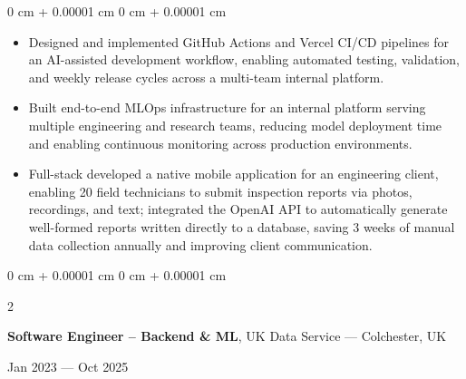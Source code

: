 \documentclass[6pt, letterpaper]{article}
\newenvironment{highlights}{
    \begin{itemize}[
        topsep=0.03 cm,
        parsep=0.03 cm,
        partopsep=0pt,
        itemsep=0pt,
        leftmargin=0 cm + 10pt
    ]
}{
    \end{itemize}
} %
\newenvironment{onecolentry}{
    \begin{adjustwidth}{
        0 cm + 0.00001 cm
    }{
        0 cm + 0.00001 cm
    }
}{
    \end{adjustwidth}
} %
\newenvironment{twocolentry}[2][]{
    \onecolentry
    \def\secondColumn{#2}
    \setcolumnwidth{\fill, 4.5 cm}
    \begin{paracol}{2}
}{
    \switchcolumn \raggedleft \secondColumn
    \end{paracol}
    \endonecolentry
} %
\begin{document}
        \begin{onecolentry}
        \begin{highlights}

            \item Designed and implemented GitHub Actions and Vercel CI/CD pipelines for an AI-assisted development workflow, enabling automated testing, validation, and weekly release cycles across a multi-team internal platform.
            \item Built end-to-end MLOps infrastructure for an internal platform serving multiple engineering and research teams, reducing model deployment time and enabling continuous monitoring across production environments.
            \item Full-stack developed a native mobile application for an engineering client, enabling 20 field technicians to submit inspection reports via photos, recordings, and text; integrated the OpenAI API to automatically generate well-formed reports written directly to a database, saving 3 weeks of manual data collection annually and improving client communication.

        \end{highlights}
        \end{onecolentry}

        \begin{twocolentry}{Jan 2023 --- Oct 2025}
            \textbf{Software Engineer – Backend \& ML}, UK Data Service --- Colchester, UK
        \end{twocolentry}
\end{document}
